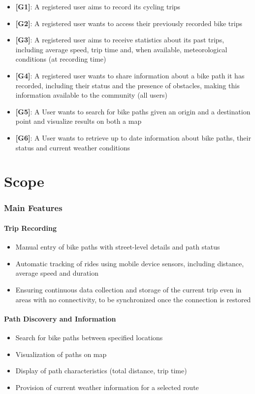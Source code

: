 \begin{itemize}
    \item \textbf{[G1]}: A registered user aims to record its cycling trips
    \item \textbf{[G2]}: A registered user wants to access their previously recorded bike trips
    \item \textbf{[G3]}: A registered user aims to receive statistics about its past trips, including average speed, trip time and, when available, meteorological conditions (at recording time)
    \item \textbf{[G4]}: A registered user wants to share information about a bike path it has recorded, including their status and the presence of obstacles, making this information available to the community (all users)
    \item \textbf{[G5]}: A User wants to search for bike paths given an origin and a destination point and visualize results on both a map
    \item \textbf{[G6]}: A User wants to retrieve up to date information about bike paths, their status and current weather conditions
\end{itemize}

\section{Scope}
\label{sec:scope}

\subsubsection{Main Features}

\paragraph{Trip Recording}
\begin{itemize}
    \item Manual entry of bike paths with street-level details and path status
    \item Automatic tracking of rides using mobile device sensors, including distance, average speed and duration
    \item Ensuring continuous data collection and storage of the current trip even in areas with no connectivity, to be synchronized once the connection is restored
\end{itemize}

\paragraph{Path Discovery and Information}
\begin{itemize}
    \item Search for bike paths between specified locations
    \item Visualization of paths on map
    \item Display of path characteristics (total distance, trip time)
    \item Provision of current weather information for a selected route
\end{itemize}

